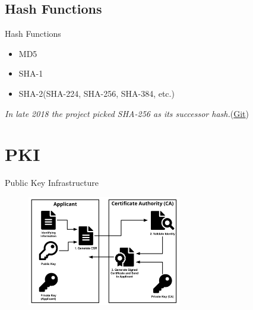 \documentclass[UTF8]{ctexbeamer}
\begin{document}
\subsection{Hash Functions}
\begin{frame}{Hash Functions}
    \begin{itemize}
        \item MD5
        \item SHA-1
        \item SHA-2(SHA-224, SHA-256, SHA-384, etc.)
    \end{itemize}
    
    \vspace{1em}
    
    \textit{In late 2018 the project picked SHA-256 as its successor hash.}\hspace{1em}(\href{https://git-scm.com/docs/hash-function-transition/}{Git})
\end{frame}

\section{PKI}
\begin{frame}{Public Key Infrastructure}
    \begin{figure}
        \centering
        \includegraphics[width=0.6\textwidth]{ca-diagram.png}
    \end{figure}
\end{frame}
\end{document}

